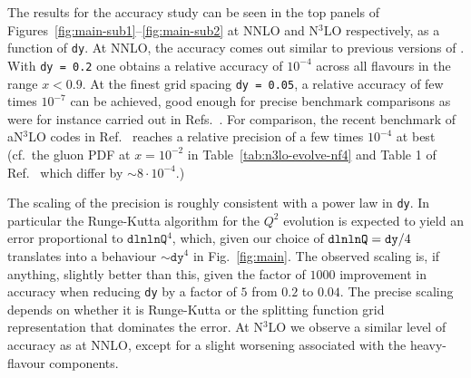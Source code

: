 The results for the accuracy study can be seen in the top panels of
Figures~\ref{fig:main-sub1}--\ref{fig:main-sub2} at NNLO and N$^3$LO
respectively, as a function of \texttt{dy}.
%
At NNLO, the accuracy comes out similar to previous
versions of \hoppet.
%
With \texttt{dy =
  0.2} one obtains a relative accuracy of $10^{-4}$ across all
flavours in the range $x < 0.9$.
%
At the finest grid spacing \texttt{dy = 0.05}, a relative accuracy of
few times $10^{-7}$ can be achieved, good enough for precise benchmark
comparisons as were for instance carried out in
Refs.~\cite{Dittmar:2005ed,Bertone:2024dpm}.
%
For comparison,
the recent benchmark of aN$^3$LO codes in
Ref.~\cite{Cooper-Sarkar:2024crx} reaches a relative precision of a
few times $10^{-4}$ at best (cf.\ the gluon PDF at $x = 10^{-2}$ in
Table~\ref{tab:n3lo-evolve-nf4} and Table 1 of
Ref.~\cite{Cooper-Sarkar:2024crx} which differ by $\sim 8\cdot 10^{-4}$.)

The scaling of the precision is roughly consistent with a power law in
\texttt{dy}.
%
In particular the Runge-Kutta algorithm for the $Q^2$ evolution is
expected to yield an error proportional to $\texttt{dlnlnQ}^4$, which,
given our choice of $\texttt{dlnlnQ} = \texttt{dy}/4$
translates into a behaviour $\sim \texttt{dy}^4$ in
Fig.~\ref{fig:main}.
%
The observed scaling is, if anything, slightly better than this, given
the factor of $1000$ improvement in accuracy when reducing \texttt{dy}
by a factor of $5$ from $0.2$ to $0.04$.
%
The precise scaling depends on whether it is Runge-Kutta or the
splitting function grid representation that dominates the error.
%
At N$^3$LO we observe a similar level of accuracy as at NNLO, except
for a slight worsening associated with the heavy-flavour components.



